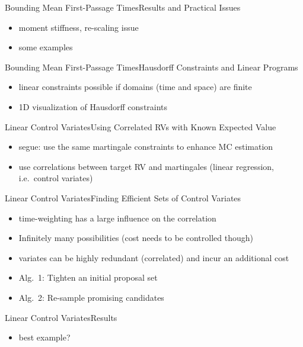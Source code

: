 \documentclass{beamer}
\begin{document}
\begin{frame}{Bounding Mean First-Passage Times}{Results and Practical Issues}
  \begin{itemize}
    \item moment stiffness, re-scaling issue
    \item some examples
  \end{itemize}
\end{frame}

\begin{frame}{Bounding Mean First-Passage Times}{Hausdorff Constraints and Linear Programs}
  \begin{itemize}
    \item linear constraints possible if domains (time and space) are finite
    \item 1D visualization of Hausdorff constraints
  \end{itemize}
\end{frame}

\begin{frame}{Linear Control Variates}{Using Correlated RVs with Known Expected Value}
  \begin{itemize}
    \item segue: use the same martingale constraints to enhance MC estimation
    \item use correlations between target RV and martingales (linear regression, i.e.\ control variates)
  \end{itemize}
\end{frame}

\begin{frame}{Linear Control Variates}{Finding Efficient Sets of Control Variates}
  \begin{itemize}
    \item time-weighting has a large influence on the correlation
    \item Infinitely many possibilities (cost needs to be controlled though)
    \item variates can be highly redundant (correlated) and incur an additional cost
    \item Alg.~1: Tighten an initial proposal set
    \item Alg.~2: Re-sample promising candidates
  \end{itemize}
\end{frame}

\begin{frame}{Linear Control Variates}{Results}
  \begin{itemize}
    \item best example?
  \end{itemize}
\end{frame}
\end{document}
